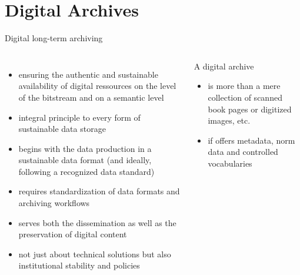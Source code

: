 

\section{Digital Archives}
\begin{frame}{Digital long-term archiving}
\footnotesize
\begin{columns}
\begin{itemize}
\item ensuring the authentic and sustainable availability of digital ressources on the level of the bitstream and on a semantic level
\item integral principle to every form of sustainable data storage
\item begins with the data production in a sustainable data format (and ideally, following a recognized data standard)
\item requires standardization of data formats and archiving workflows
\item serves both the dissemination as well as the preservation of digital content
\item not just about technical solutions but also institutional stability and policies
\end{itemize}

\begin{block}{A digital archive}
\begin{itemize}
\item is more than a mere collection of scanned book pages or digitized images, etc.
\item if offers metadata, norm data and controlled vocabularies
\end{itemize}
\end{block}

\end{columns}
\end{frame}


